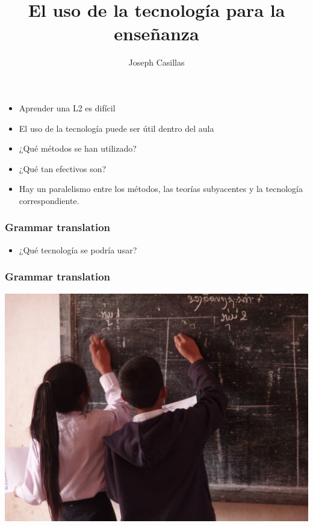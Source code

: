 \documentclass{beamer}
\title{El uso de la tecnología para la enseñanza}
\author[Casillas]{Joseph Casillas}
\institute{Español 457}
\date{}
\begin{document}
\begin{frame}%
  \titlepage
\end{frame}


\begin{frame}
	\begin{itemize} 
	\itemsep=1em
		\item Aprender una L2 es difícil  \pause
		\item El uso de la tecnología puede ser útil dentro del aula  \pause
		\item ¿Qué métodos se han utilizado? \pause
		\item ¿Qué tan efectivos son? \pause
		\item Hay un paralelismo entre los métodos, las teorías subyacentes y la tecnología correspondiente. 
	\end{itemize}
\end{frame}




\begin{frame}
	\frametitle{Grammar translation}

	\begin{itemize}
		\item ¿Qué tecnología se podría usar?
	\end{itemize}
\end{frame}

\begin{frame}
	\frametitle{Grammar translation}

	\begin{center}
		\includegraphics[width=\textwidth]{figures/chalkboard.jpg}
	\end{center}
\end{frame}
\end{document}
